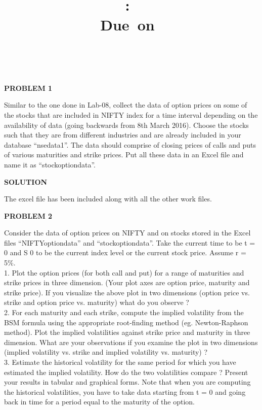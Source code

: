 \documentclass{article}
\title{
\vspace{2in}
\textmd{\textbf{\hmwkClass:\ \hmwkTitle}}\\
\normalsize\vspace{0.1in}\small{Due\ on\ \hmwkDueDate}\\
\vspace{0.1in}\large{\textit{\hmwkClassInstructor\ \hmwkClassTime}}
\vspace{3in}
}
\author{\textbf{\hmwkAuthorName}}
\date{} %
\begin{document}
\maketitle
\newpage

\begin{center}
\textbf{PROBLEM 1}
\end{center}

Similar to the one done in Lab-08, collect the data of option prices on some of the stocks that are included in NIFTY
index for a time interval depending on the availability of data (going backwards from 8th March 2016). Choose the
stocks such that they are from different industries and are already included in your database “nsedata1”. The data
should comprise of closing prices of calls and puts of various maturities and strike prices. Put all these data in an
Excel file and name it as “stockoptiondata”.

\begin{center}
\textbf{SOLUTION}
\end{center}

The excel file has been included along with all the other work files.

\begin{center}
\textbf{PROBLEM 2}
\end{center}

Consider the data of option prices on NIFTY and on stocks stored in the Excel files “NIFTYoptiondata” and
“stockoptiondata”. Take the current time to be t = 0 and S 0 to be the current index level or the current stock price.
Assume r = 5\%.\\
1. Plot the option prices (for both call and put) for a range of maturities and strike prices in three dimension. (Your
plot axes are option price, maturity and strike price). If you visualize the above plot in two dimensions (option
price vs. strike and option price vs. maturity) what do you observe ?\\
2. For each maturity and each strike, compute the implied volatility from the BSM formula using the appropriate
root-finding method (eg. Newton-Raphson method).
Plot the implied volatilities against strike price and maturity in three dimension. What are your observations if
you examine the plot in two dimensions (implied volatility vs. strike and implied volatility vs. maturity) ?\\
3. Estimate the historical volatility for the same period for which you have estimated the implied volatility. How
do the two volatilities compare ? Present your results in tabular and graphical forms.
Note that when you are computing the historical volatilities, you have to take data starting from t = 0 and going
back in time for a period equal to the maturity of the option.\\
\end{document}
